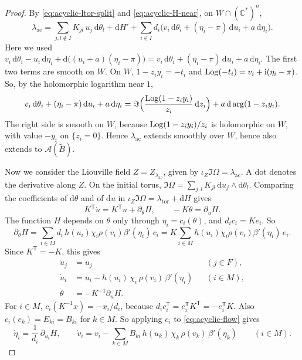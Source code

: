 \documentclass[11pt,a4paper]{article}
\newcommand{\cA}{\mathcal A}\newcommand{\sA}{\mathcal A}
\newcommand{\bC}{\mathbb C}\newcommand{\bR}{\mathbb R}\newcommand{\bZ}{\mathbb Z}
\newcommand{\dd}{\mathrm d}\newcommand{\T}{\mathsf T}
\newcommand{\ltor}{\lambda_{\mathrm{tor}}}
\begin{document}
\begin{proof}
By \eqref{eq:acyclic-ltor-split} and \eqref{eq:acyclic-H-near}, on $W\cap(\bC^*)^{n}$,
\[
 \lambda_{\mathrm{ac}}=\sum_{j,l\notin I}K_{jl}\,u_j\,\dd\theta_l+\dd H'+\sum_{i\in I}d_i\bigl(v_i\,\dd\theta_i+(\eta_i-\pi)\,\dd u_i+a\,\dd\eta_i\bigr).
\]
Here we used $v_i\,\dd\theta_i-u_i\,\dd\eta_i+\dd\bigl((u_i+a)(\eta_i-\pi)\bigr)=v_i\,\dd\theta_i+(\eta_i-\pi)\,\dd u_i+a\,\dd\eta_i$.
The first two terms are smooth on $W$.
On $W$, $1-z_iy_i=-t_i$ and $\operatorname{Log}(-t_i)=v_i+\mathrm i(\eta_i-\pi)$.
So, by the holomorphic logarithm near $1$,
\[
 v_i\,\dd\theta_i+(\eta_i-\pi)\,\dd u_i+a\,\dd\eta_i
 =\Im\Bigl(\frac{\Log(1-z_iy_i)}{z_i}\,\dd z_i\Bigr)+a\,\dd\arg(1-z_iy_i).
\]
The right side is smooth on $W$, because $\operatorname{Log}(1-z_iy_i)/z_i$ is holomorphic on $W$, with value $-y_i$ on $\{z_i=0\}$.
Hence $\lambda_{\mathrm{ac}}$ extends smoothly over $W$,  hence also extends to $\cA(\widetilde B)$.


Now we consider the Liouville field $Z=Z_{\lambda_{\mathrm{ac}}}$, given by $\iota_Z\Im\Omega=\lambda_{\mathrm{ac}}$.
A dot denotes the derivative along $Z$.
On the initial torus, $\Im\Omega=\sum_{j,l}K_{jl}\,\dd u_j\wedge\dd\theta_l$.
Comparing the coefficients of $\dd\theta$ and of $\dd u$ in $\iota_Z\Im\Omega=\ltor+\dd H$ gives
\[
 K^{\T}\dot u=K^{\T}u+\partial_\theta H,\qquad -K\dot\theta=\partial_uH .
\]
The function $H$ depends on $\theta$ only through $\eta_i=c_i(\theta)$, and $d_ic_i=Ke_i$.
So
\[
 \partial_\theta H=\sum_{i\in M}d_i\,h(u_i)\chi_i\rho(v_i)\beta'(\eta_i)\,c_i
 =K\sum_{i\in M}h(u_i)\chi_i\rho(v_i)\beta'(\eta_i)\,e_i .
\]
Since $K^{\T}=-K$, this gives
\begin{equation}\label{eq:acyclic-flow}
 \begin{aligned}
 \dot u_j&=u_j &&(j\in F),\\
 \dot u_i&=u_i-h(u_i)\,\chi_i\,\rho(v_i)\,\beta'(\eta_i) &&(i\in M),\\
 \dot\theta&=-K^{-1}\partial_uH .
 \end{aligned}
\end{equation}
For $i\in M$, $c_i(K^{-1}x)=-x_i/d_i$, because $d_ic_i^{\T}=e_i^{\T}K^{\T}=-e_i^{\T}K$.
Also $c_i(e_k)=E_{ki}=B_{ki}$ for $k\in M$.
So applying $c_i$ to \eqref{eq:acyclic-flow} gives
\begin{equation}\label{eq:acyclic-angle-flow}
 \dot\eta_i=\frac1{d_i}\,\partial_{u_i}H,\qquad
 \dot v_i=v_i-\sum_{k\in M}B_{ki}\,h(u_k)\,\chi_k\,\rho(v_k)\,\beta'(\eta_k)\qquad(i\in M).
\end{equation}


\end{proof}
\end{document}
